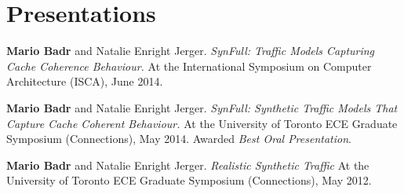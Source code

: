 \section{\sc Presentations}

\onerow
{
  \textbf{Mario Badr} and Natalie Enright Jerger.
  \textit{SynFull: Traffic Models Capturing Cache Coherence Behaviour.}
  At the International Symposium on Computer Architecture (ISCA), June 2014.
}

\onerow
{
  \textbf{Mario Badr} and Natalie Enright Jerger.
  \textit{SynFull: Synthetic Traffic Models That Capture Cache Coherent Behaviour.}
  At the University of Toronto ECE Graduate Symposium (Connections), May 2014.
  Awarded \textit{Best Oral Presentation}.
}

\onerow
{
  \textbf{Mario Badr} and Natalie Enright Jerger.
  \textit{Realistic Synthetic Traffic}
  At the University of Toronto ECE Graduate Symposium (Connections), May 2012.
}
